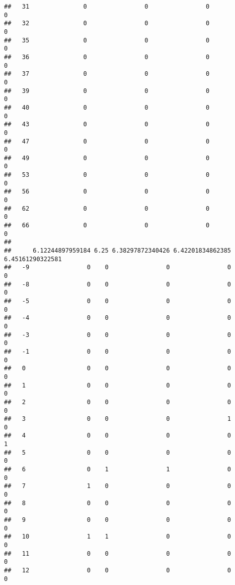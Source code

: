 \documentclass[]{article}
\begin{document}
\begin{verbatim}
##   31               0                0                0                0
##   32               0                0                0                0
##   35               0                0                0                0
##   36               0                0                0                0
##   37               0                0                0                0
##   39               0                0                0                0
##   40               0                0                0                0
##   43               0                0                0                0
##   47               0                0                0                0
##   49               0                0                0                0
##   53               0                0                0                0
##   56               0                0                0                0
##   62               0                0                0                0
##   66               0                0                0                0
##     
##      6.12244897959184 6.25 6.38297872340426 6.42201834862385 6.45161290322581
##   -9                0    0                0                0                0
##   -8                0    0                0                0                0
##   -5                0    0                0                0                0
##   -4                0    0                0                0                0
##   -3                0    0                0                0                0
##   -1                0    0                0                0                0
##   0                 0    0                0                0                0
##   1                 0    0                0                0                0
##   2                 0    0                0                0                0
##   3                 0    0                0                1                0
##   4                 0    0                0                0                1
##   5                 0    0                0                0                0
##   6                 0    1                1                0                0
##   7                 1    0                0                0                0
##   8                 0    0                0                0                0
##   9                 0    0                0                0                0
##   10                1    1                0                0                0
##   11                0    0                0                0                0
##   12                0    0                0                0                0

\end{verbatim}
\end{document}
